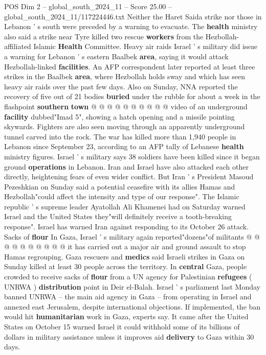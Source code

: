 \begin{textsample}{POS Dim 2 – global\_south\_2024\_11 – Score 25.00 – global\_south\_2024\_11/117224446.txt}
Neither the Haret Saida strike nor those in Lebanon ' s south were preceded by a warning to evacuate.
The \textbf{health} ministry also said a strike near Tyre killed two rescue \textbf{workers} from the Hezbollah-affiliated Islamic \textbf{Health} Committee.
Heavy air raids Israel ' s military did issue a warning for Lebanon ' s eastern Baalbek \textbf{area}, saying it would attack Hezbollah-linked \textbf{facilities}.
An AFP correspondent later reported at least three strikes in the Baalbek \textbf{area}, where Hezbollah holds sway and which has seen heavy air raids over the past few days.
Also on Sunday, NNA reported the recovery of five out of 21 bodies \textbf{buried} under the rubble for about a week in the flashpoint \textbf{southern} \textbf{town} @ @ @ @ @ @ @ @ @ @ video of an underground \textbf{facility} dubbed"Imad 5", showing a hatch opening and a missile pointing skywards.
Fighters are also seen moving through an apparently underground tunnel carved into the rock.
The war has killed more than 1,940 people in Lebanon since September 23, according to an AFP tally of Lebanese \textbf{health} ministry figures.
Israel ' s military says 38 soldiers have been killed since it began ground \textbf{operations} in Lebanon.
Iran and Israel have also attacked each other directly, heightening fears of even wider conflict.
But Iran ' s President Masoud Pezeshkian on Sunday said a potential ceasefire with its allies Hamas and Hezbollah"could affect the intensity and type of our response".
The Islamic republic ' s supreme leader Ayatollah Ali Khamenei had on Saturday warned Israel and the United States they"will definitely receive a tooth-breaking response".
Israel has warned Iran against responding to its October 26 attack.
Sacks of \textbf{flour} In Gaza, Israel ' s military again reported"dozens"of militants @ @ @ @ @ @ @ @ @ @ it has carried out a major air and ground assault to stop Hamas regrouping.
Gaza rescuers and \textbf{medics} said Israeli strikes in Gaza on Sunday killed at least 30 people across the territory.
In \textbf{central} Gaza, people crowded to receive sacks of \textbf{flour} from a UN agency for Palestinian \textbf{refugees} ( UNRWA ) \textbf{distribution} point in Deir el-Balah.
Israel ' s parliament last Monday banned UNRWA -- the main aid agency in Gaza -- from operating in Israel and annexed east Jerusalem, despite international objections.
If implemented, the ban would hit \textbf{humanitarian} work in Gaza, experts say.
It came after the United States on October 15 warned Israel it could withhold some of its billions of dollars in military assistance unless it improves aid \textbf{delivery} to Gaza within 30 days.

\end{textsample}
